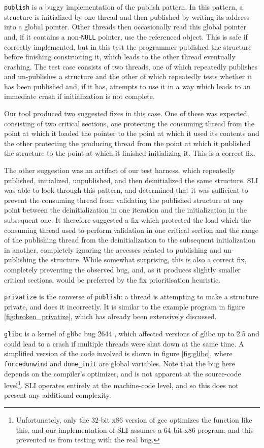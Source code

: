 \documentclass[10pt,twocolumn,preprint,natbib,authoryear]{sigplanconf}
\begin{document}
\verb|publish| is a buggy implementation of the publish pattern.  In
this pattern, a structure is initialized by one thread and then
published by writing its address into a global pointer.  Other threads
then occasionally read this global pointer and, if it contains a
non-\verb|NULL| pointer, use the referenced object.  This is safe if
correctly implemented, but in this test the programmer published the
structure before finishing constructing it, which leads to the other
thread eventually crashing.  The test case consists of two threads,
one of which repeatedly publishes and un-publishes a structure and the
other of which repeatedly tests whether it has been published and, if
it has, attempts to use it in a way which leads to an immediate crash
if initialization is not complete.

Our tool produced two suggested fixes in this case.  One of these was
expected, consisting of two critical sections, one protecting the
consuming thread from the point at which it loaded the pointer to the
point at which it used its contents and the other protecting the
producing thread from the point at which it published the structure to
the point at which it finished initializing it.  This is a correct
fix.

The other suggestion was an artifact of our test harness, which
repeatedly published, initialized, unpublished, and then deinitialized
the same structure.  SLI was able to look through this pattern, and
determined that it was sufficient to prevent the consuming thread from
validating the published structure at any point between the
deinitialization in one iteration and the initialization in the
subsequent one.  It therefore suggested a fix which protected the load
which the consuming thread used to perform validation in one critical
section and the range of the publishing thread from the
deinitialization to the subsequent initialization in another,
completely ignoring the accesses related to publishing and
un-publishing the structure.  While somewhat surprising, this is also
a correct fix, completely preventing the observed bug, and, as it
produces slightly smaller critical sections, would be preferred by the
fix prioritisation heuristic.

\verb|privatize| is the converse of \verb|publish|: a thread is
attempting to make a structure private, and does it incorrectly.  It
is similar to the example program in figure
\ref{fig:broken_privatize}, which has already been extensively
discussed.

\verb|glibc| is a kernel of glibc bug 2644 \cite{glibc2644}, which
affected versions of glibc up to 2.5 and could lead to a crash if
multiple threads were shut down at the same time.  A simplified
version of the code involved is shown in figure \ref{fig:glibc}, where
\verb|forcedunwind| and \verb|done_init| are global variables.  Note
that the bug here depends on the compiler's optimizer, and is not
apparent at the source-code level\footnote{Unfortunately, only the
  32-bit x86 version of gcc optimizes the function like this, and our
  implementation of SLI assumes a 64-bit x86 program, and this
  prevented us from testing with the real bug.}.  SLI operates
entirely at the machine-code level, and so this does not present any
additional complexity.
\end{document}

